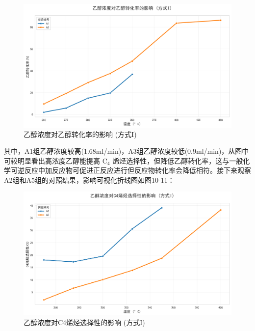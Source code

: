 \newpage

\begin{figure}[h]%
	\centering%
	\includegraphics [scale=0.6]{图/2-2-1-2.png}
	\caption{乙醇浓度对乙醇转化率的影响 (方式I)} 
	\label{fig:1}
\end{figure}

其中，A1组乙醇浓度较高(1.68ml/min)，A3组乙醇浓度较低(0.9ml/min)，从图中可较明显看出高浓度乙醇能提高 \( \text{C}_4 \) 烯烃选择性，但降低乙醇转化率，这与一般化学可逆反应中加反应物可促进正反应进行但反应物转化率会降低相符。接下来观察A2组和A5组的对照结果，影响可视化折线图如图10-11：

\begin{figure}[h]%
	\centering%
	\includegraphics [scale=0.6]{图/2-2-2-1.png}
	\caption{乙醇浓度对C4烯烃选择性的影响 (方式I)} 
	\label{fig:1}
\end{figure}

